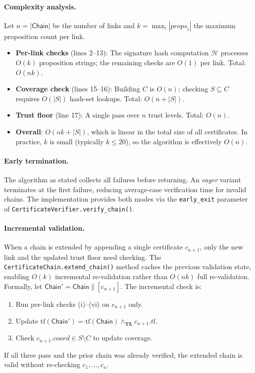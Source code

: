 \documentclass[11pt]{article}
\newcommand{\Chain}{\mathsf{Chain}}            %
\newcommand{\certcoord}{\mathit{coord}}        %
\newcommand{\certprops}{\mathit{props}}        %
\newcommand{\certtrust}{\mathit{tl}}           %
\newcommand{\TL}{\mathbf{TL}}                  %
\newcommand{\tlmin}{\wedge_{\TL}}             %
\newcommand{\Sigalg}{\mathcal{H}}              %
\begin{document}
\paragraph{Complexity analysis.}
Let $n = |\Chain|$ be the number of links and $k = \max_i |\certprops_i|$
the maximum proposition count per link.

\begin{itemize}
  \item \textbf{Per-link checks} (lines 2--13): The signature hash computation
        $\Sigalg$ processes $O(k)$ proposition strings; the remaining checks are
        $O(1)$ per link.  Total: $O(nk)$.
  \item \textbf{Coverage check} (lines 15--16): Building $C$ is $O(n)$; checking
        $S \subseteq C$ requires $O(|S|)$ hash-set lookups.  Total: $O(n + |S|)$.
  \item \textbf{Trust floor} (line 17): A single pass over $n$ trust levels.
        Total: $O(n)$.
  \item \textbf{Overall}: $O(nk + |S|)$, which is linear in the total size of
        all certificates.  In practice, $k$ is small (typically $k \le 20$), so
        the algorithm is effectively $O(n)$.
\end{itemize}

\paragraph{Early termination.}
The algorithm as stated collects all failures before returning.
An \emph{eager} variant terminates at the first failure, reducing
average-case verification time for invalid chains.  The implementation
provides both modes via the \texttt{early\_exit} parameter of
\texttt{CertificateVerifier.verify\_chain()}.

\paragraph{Incremental validation.}
When a chain is extended by appending a single certificate $c_{n+1}$,
only the new link and the updated trust floor need checking.  The
\texttt{CertificateChain.extend\_chain()} method caches the previous
validation state, enabling $O(k)$ incremental re-validation rather
than $O(nk)$ full re-validation.  Formally, let $\Chain' = \Chain
\mathbin{\|} [c_{n+1}]$.  The incremental check is:
\begin{enumerate}
  \item Run per-link checks (i)--(vi) on $c_{n+1}$ only.
  \item Update $\mathrm{tf}(\Chain') = \mathrm{tf}(\Chain) \tlmin c_{n+1}.\certtrust$.
  \item Check $c_{n+1}.\certcoord \in S \setminus C$ to update coverage.
\end{enumerate}
If all three pass and the prior chain was already verified, the extended
chain is valid without re-checking $c_1, \ldots, c_n$.
\end{document}
